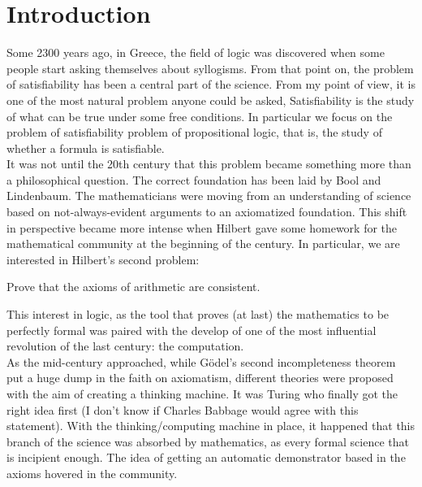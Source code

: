 
\chapter{Introduction}
Some 2300 years ago, in Greece,  the field of logic was discovered when some people start asking themselves about syllogisms. From that point on, the problem of satisfiability has been a central part of the science.  From my point of view, it is one of the most natural problem anyone could be asked,  Satisfiability is the study of what can be true under some free conditions. In particular we focus on the problem of satisfiability problem of propositional logic, that is, the study of whether a formula is satisfiable.\\

It was not until the 20th century that this problem became something more than a philosophical question. The correct foundation has been laid by Bool and Lindenbaum. The mathematicians were moving from an understanding of science based on not-always-evident arguments to an axiomatized foundation. This shift in perspective became more intense when Hilbert gave some homework for the mathematical community at the beginning of the century. In particular, we are interested in Hilbert's second problem:


\begin{quoting}
Prove that the axioms of arithmetic are consistent. 
\end{quoting}

This interest in logic, as the tool that proves (at last) the mathematics to be perfectly formal was paired with the develop of one of the most influential revolution of the last century: the computation.\\

As the mid-century approached, while Gödel's second incompleteness theorem put a huge dump in the faith on axiomatism,  different theories were proposed with the aim of creating a thinking machine. It was Turing who finally got the right idea first (I don't know if Charles Babbage would agree with this statement). With the thinking/computing machine in place, it happened that this branch of the science was absorbed by mathematics, as every formal science that is incipient enough.  The idea of getting an automatic demonstrator based in the axioms hovered in the community.\\


